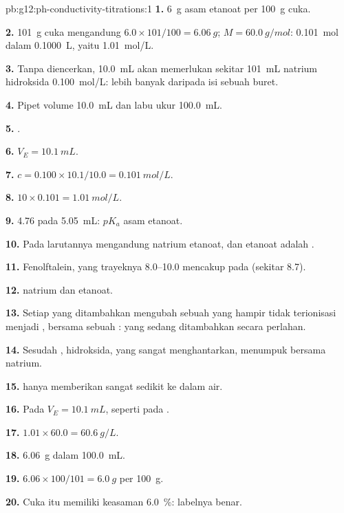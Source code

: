\begin{solution}{pb:g12:ph-conductivity-titrations:1}
\textbf{1.} \qty{6}{g} asam etanoat per \qty{100}{g} cuka.

\textbf{2.} \qty{101}{g} cuka mengandung $6.0 \times 101/100 =
\qty{6.06}{g}$; $M = \qty{60.0}{g/mol}$: \qty{0.101}{mol} dalam
\qty{0.1000}{L}, yaitu \qty{1.01}{mol/L}.

\textbf{3.} Tanpa diencerkan, \qty{10.0}{mL} akan memerlukan sekitar
\qty{101}{mL} natrium hidroksida \qty{0.100}{mol/L}: lebih banyak
daripada isi sebuah buret.

\textbf{4.} Pipet volume \qty{10.0}{mL} dan labu ukur
\qty{100.0}{mL}.

\textbf{5.} .

\textbf{6.} $V_E = \qty{10.1}{mL}$.

\textbf{7.} $c = 0.100 \times 10.1 / 10.0 = \qty{0.101}{mol/L}$.

\textbf{8.} $10 \times 0.101 = \qty{1.01}{mol/L}$.

\textbf{9.}  4.76 pada \qty{5.05}{mL}: $pK_a$ asam etanoat.

\textbf{10.} Pada  larutannya mengandung natrium
etanoat, dan etanoat adalah .

\textbf{11.} Fenolftalein, yang trayeknya 8.0--10.0 mencakup  pada
 (sekitar 8.7).

\textbf{12.}  natrium dan  etanoat.

\textbf{13.} Setiap  yang ditambahkan mengubah sebuah 
yang hampir tidak terionisasi menjadi , bersama sebuah
:  yang  sedang ditambahkan secara
perlahan.

\textbf{14.} Sesudah ,  hidroksida, yang sangat
menghantarkan, menumpuk bersama  natrium.

\textbf{15.}  hanya memberikan sangat sedikit  ke dalam
air.

\textbf{16.} Pada $V_E = \qty{10.1}{mL}$, seperti pada .

\textbf{17.} $1.01 \times 60.0 = \qty{60.6}{g/L}$.

\textbf{18.} \qty{6.06}{g} dalam \qty{100.0}{mL}.

\textbf{19.} $6.06 \times 100 / 101 = \qty{6.0}{g}$ per \qty{100}{g}.

\textbf{20.} Cuka itu memiliki keasaman \qty{6.0}{\percent}: labelnya
benar.
\end{solution}
